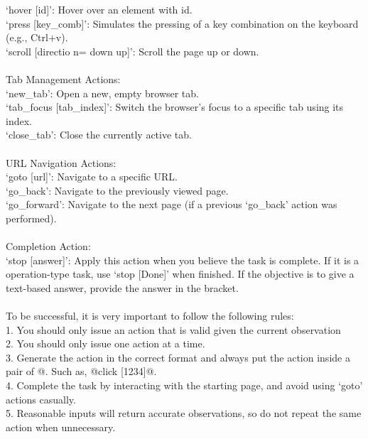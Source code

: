 \begin{tcolorbox}[breakable,title=Prompt Details for WebArena ]
\textnormal{`hover [id]': Hover over an element with id.}\\
\textnormal{`press [key\_comb]':  Simulates the pressing of a key combination on the keyboard (e.g., Ctrl+v).}\\
\textnormal{`scroll [directio n= down \textbar up]': Scroll the page up or down.}\\
\\
\textnormal{Tab Management Actions:}\\
\textnormal{`new\_tab': Open a new, empty browser tab.}\\
\textnormal{`tab\_focus [tab\_index]': Switch the browser's focus to a specific tab using its index.}\\
\textnormal{`close\_tab': Close the currently active tab.}\\
\\
\textnormal{URL Navigation Actions:}\\
\textnormal{`goto [url]': Navigate to a specific URL.}\\
\textnormal{`go\_back': Navigate to the previously viewed page.}\\
\textnormal{`go\_forward': Navigate to the next page (if a previous `go\_back' action was performed).}\\
\\
\textnormal{Completion Action:}\\
\textnormal{`stop [answer]': Apply this action when you believe the task is complete. If it is a operation-type task, use `stop [Done]' when finished. If the objective is to give a text-based answer, provide the answer in the bracket.}\\
\\
\textnormal{To be successful, it is very important to follow the following rules:}\\
\textnormal{1. You should only issue an action that is valid given the current observation}\\
\textnormal{2. You should only issue one action at a time.}\\
\textnormal{3. Generate the action in the correct format and always put the action inside a pair of @. Such as, @click [1234]@.}\\
\textnormal{4. Complete the task by interacting with the starting page, and avoid using `goto' actions casually.}\\
\textnormal{5. Reasonable inputs will return accurate observations, so do not repeat the same action when unnecessary.}


\end{tcolorbox}
